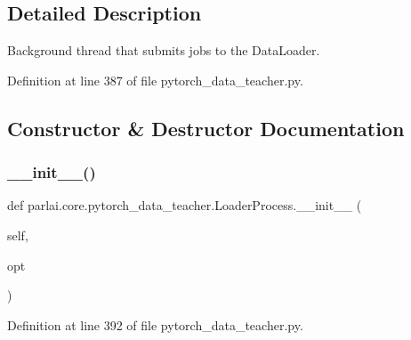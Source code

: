 \subsection{Detailed Description}
\begin{DoxyVerb}Background thread that submits jobs to the DataLoader.
\end{DoxyVerb}
 

Definition at line 387 of file pytorch\+\_\+data\+\_\+teacher.\+py.



\subsection{Constructor \& Destructor Documentation}
\mbox{\label{classparlai_1_1core_1_1pytorch__data__teacher_1_1LoaderProcess_a4d40640c8122f0f93dc49a3eaa188260}} 
\subsubsection{\texorpdfstring{\+\_\+\+\_\+init\+\_\+\+\_\+()}{\_\_init\_\_()}}
{\footnotesize\ttfamily def parlai.\+core.\+pytorch\+\_\+data\+\_\+teacher.\+Loader\+Process.\+\_\+\+\_\+init\+\_\+\+\_\+ (\begin{DoxyParamCaption}\item[{}]{self,  }\item[{}]{opt }\end{DoxyParamCaption})}



Definition at line 392 of file pytorch\+\_\+data\+\_\+teacher.\+py.


